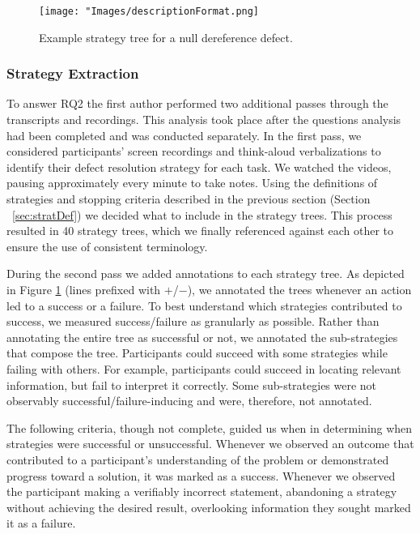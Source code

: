 \documentclass[10pt,journal,compsoc]{IEEEtran}
\begin{document}
\begin{figure}
	\centering
	\texttt{[image: "Images/descriptionFormat.png]}
	\caption{Example strategy tree for a null dereference defect. }
	\label{fig:description} 
\end{figure}

%



\subsubsection{Strategy Extraction}
To answer RQ2 the first author performed two additional passes through the transcripts and recordings. 
This analysis took place after the questions analysis had been completed and was conducted separately.
In the first pass, we considered participants' screen recordings and think-aloud verbalizations to identify their defect resolution strategy for each task. 
We watched the videos, pausing approximately every minute to take notes.
Using the definitions of strategies and stopping criteria described in the previous section (Section ~\ref{sec:stratDef}) we decided what to include in the strategy trees.
This process resulted in 40 strategy trees, which we finally referenced against each other to ensure the use of consistent terminology.



During the second pass we added annotations to each strategy tree. 
As depicted in Figure \ref{fig:description} (lines prefixed with $+$/$-$), we annotated the trees whenever an action led to a success or a failure. 
To best understand which strategies contributed to success, we measured success/failure as granularly as possible.
Rather than annotating the entire tree as successful or not, we annotated the sub-strategies that compose the tree.
Participants could succeed with some strategies while failing with others.
For example, participants could succeed in locating relevant information, but fail to interpret it correctly. 
Some sub-strategies were not observably successful/failure-inducing and were, therefore, not annotated. 

The following criteria, though not complete, guided us when in determining when strategies were successful or unsuccessful.
Whenever we observed an outcome that contributed to a participant's understanding of the problem or demonstrated progress toward a solution, it was marked as a success.
Whenever we observed the participant making a verifiably incorrect statement, abandoning a strategy without achieving the desired result, overlooking information they sought marked it as a failure.
\end{document}
